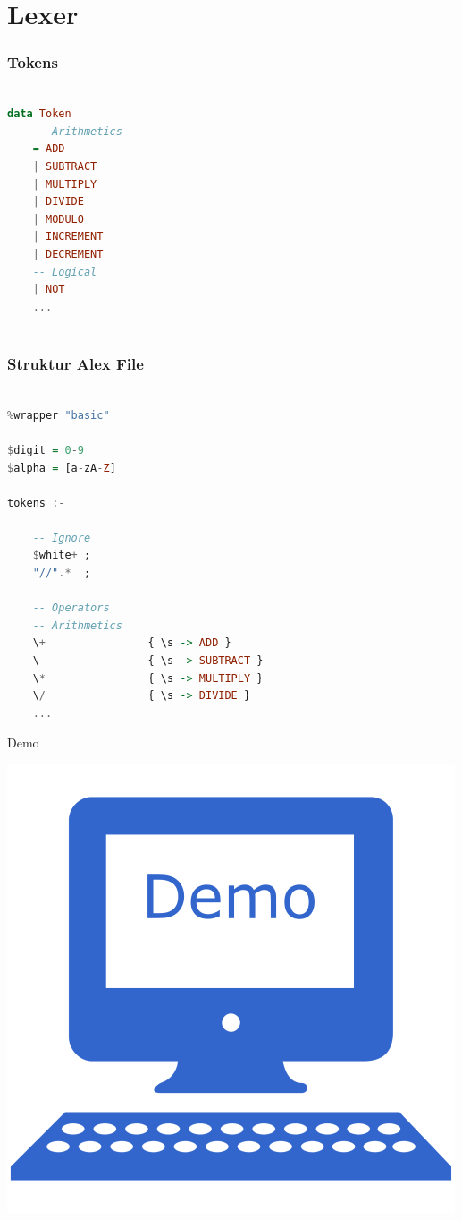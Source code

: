 \section{Lexer}

\begin{frame}[fragile]
	\frametitle{Tokens}
	\begin{lstlisting}[language=Haskell]
		
data Token
	-- Arithmetics
	= ADD
	| SUBTRACT
	| MULTIPLY
	| DIVIDE
	| MODULO
	| INCREMENT
	| DECREMENT
	-- Logical
	| NOT	
	...	
		
	\end{lstlisting}
\end{frame}

\begin{frame}[fragile]
	\frametitle{Struktur Alex File}
	\begin{lstlisting}[basicstyle=\tiny, language=Haskell]

%wrapper "basic"

$digit = 0-9
$alpha = [a-zA-Z]

tokens :-

	-- Ignore
	$white+ ; 
	"//".*  ;
	
	-- Operators
	-- Arithmetics
	\+                { \s -> ADD }
	\-                { \s -> SUBTRACT }
	\*                { \s -> MULTIPLY }
	\/                { \s -> DIVIDE }	
	...

	\end{lstlisting}
\end{frame}

\begin{frame}{Demo}

\begin{center}
	\includegraphics{images/lexer/demo.png}
\end{center}

\end{frame}